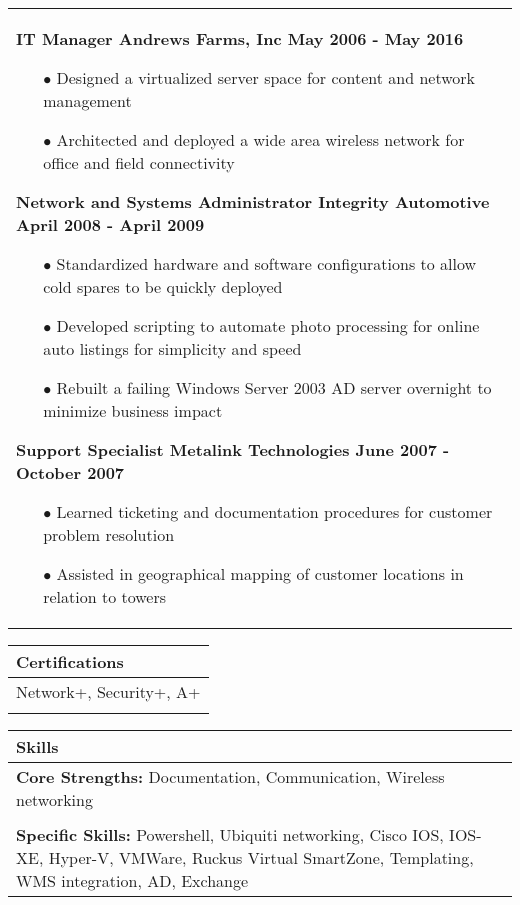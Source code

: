 \documentclass{article}
\begin{document}
\begin{tabular}{p{\dimexpr\linewidth-2\tabcolsep}}
\begin{itemize}
  \end{itemize}
  {\bfseries IT Manager \hfill Andrews Farms, Inc \qquad \qquad \qquad May 2006 - May 2016} 
 \begin{itemize}
	\item[$\bullet$]Designed a virtualized server space for content and network management
	\item[$\bullet$]Architected and deployed a wide area wireless network for office and field connectivity
  \end{itemize}
  {\bfseries Network and Systems Administrator \qquad Integrity Automotive \hfill April 2008 - April 2009}
 \begin{itemize}
	\item[$\bullet$]Standardized hardware and software configurations to allow cold spares to be quickly deployed
	\item[$\bullet$]Developed scripting to automate photo processing for online auto listings for simplicity and speed
	\item[$\bullet$]Rebuilt a failing Windows Server 2003 AD server overnight to minimize business impact
 \end{itemize}
   {\bfseries Support Specialist \hfill Metalink Technologies \quad \qquad June 2007 - October 2007}
 \begin{itemize}
 	\item[$\bullet$]Learned ticketing and documentation procedures for customer problem resolution
 	\item[$\bullet$]Assisted in geographical mapping of customer locations in relation to towers
 \end{itemize}
\end{tabular}
\begin{tabular}{p{\dimexpr\linewidth-2\tabcolsep}}
	\textbf{Certifications} \\
	\hline
	\textsf{Network+, Security+, A+} \\
	\\
\end{tabular}
\begin{tabular}{p{\dimexpr\linewidth-2\tabcolsep}}
	\textbf{Skills} \\
	\hline
	\textbf{Core Strengths:} \textsf{Documentation, Communication, Wireless networking} \\
	\\
	\textbf{Specific Skills:} \textsf{Powershell, Ubiquiti networking, Cisco IOS, IOS-XE, Hyper-V, VMWare, Ruckus Virtual SmartZone, Templating, WMS integration, AD, Exchange}
\end{tabular}
\end{document}
